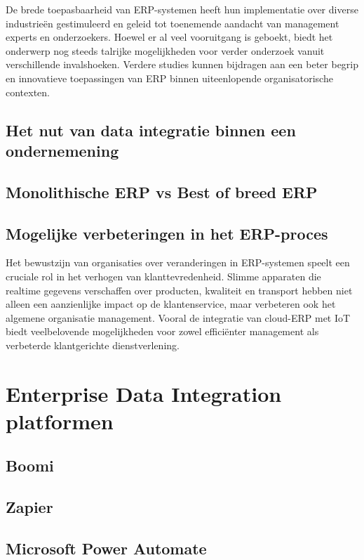 De brede toepasbaarheid van ERP-systemen heeft hun implementatie over diverse industrieën gestimuleerd en geleid tot toenemende aandacht van management experts en onderzoekers. Hoewel er al veel vooruitgang is geboekt, biedt het onderwerp nog steeds talrijke mogelijkheden voor verder onderzoek vanuit verschillende invalshoeken. Verdere studies kunnen bijdragen aan een beter begrip en innovatieve toepassingen van ERP binnen uiteenlopende organisatorische contexten. \autocite{sheik2020enterprise}

\vspace{\baselineskip}


\subsection{Het nut van data integratie binnen een ondernemening}
\label{Het nut van data integratie binnen een ondernemening}


\vspace{\baselineskip}

\subsection{Monolithische ERP vs Best of breed ERP}
\label{Monolithische ERP vs Best of breed ERP}


\vspace{\baselineskip}


\subsection{Mogelijke verbeteringen in het ERP-proces}
\label{sec:Mogelijke verbeteringen in het ERP-procesBP}

Het bewustzijn van organisaties over veranderingen in ERP-systemen speelt een cruciale rol in het verhogen van klanttevredenheid. Slimme apparaten die realtime gegevens verschaffen over producten, kwaliteit en transport hebben niet alleen een aanzienlijke impact op de klantenservice, maar verbeteren ook het algemene organisatie management. Vooral de integratie van cloud-ERP met IoT biedt veelbelovende mogelijkheden voor zowel efficiënter management als verbeterde klantgerichte dienstverlening. \autocite{tavana2020iot}

\vspace{\baselineskip}

\section{Enterprise Data Integration platformen}%
\label{sec:Enterprise Data Integration platformen}

\subsection{Boomi}
\label{Boomi}

\subsection{Zapier}
\label{Zapier}

\subsection{Microsoft Power Automate}
\label{Microsoft Power Automate}

